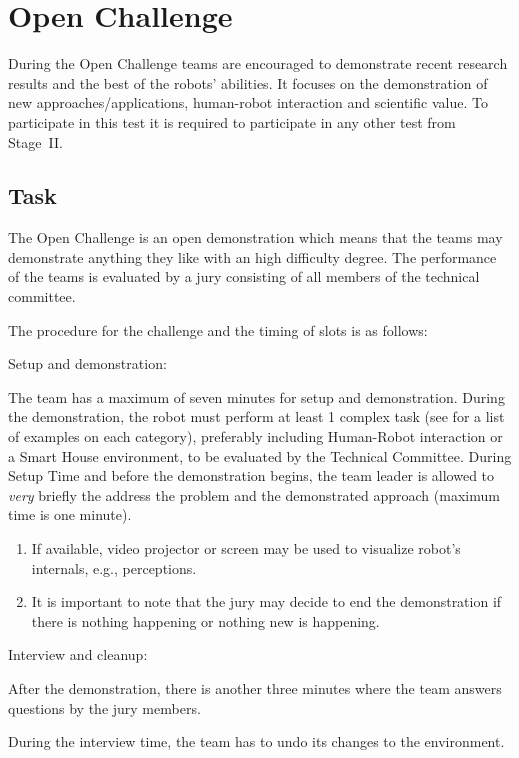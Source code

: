 \newcommand{\bonusRobotCoop}{5~}

\section{Open Challenge}
\label{sec:test_open_challenge}

During the Open Challenge teams are encouraged to demonstrate recent research results and the best of the robots' abilities. It focuses on the demonstration of new approaches/applications, human-robot interaction and scientific value. To participate in this test it is required to participate in any other test from Stage~II.

\subsection{Task}

The Open Challenge is an open demonstration which means that the teams may demonstrate anything they like with an high difficulty degree. The performance of the teams is evaluated by a jury consisting of all members of the technical committee.

The procedure for the challenge and the timing of slots is as follows:
\begin{enumerate}
  {\bf\item Setup and demonstration:} The team has a maximum of seven minutes for setup and demonstration. During the demonstration, the robot must perform at least 1 complex task (see for a list of examples on each category), preferably including Human-Robot interaction or a Smart House environment, to be evaluated by the Technical Committee. During Setup Time and before the demonstration begins, the team leader is allowed to \emph{very} briefly the address the problem and the demonstrated approach (maximum time is one minute).

	\begin{enumerate}
		\item If available, video projector or screen may be used to visualize robot's internals, e.g., perceptions.
		\item It is important to note that the jury may decide to end the demonstration if there is nothing happening or nothing new is happening.
	\end{enumerate}
  {\bf\item Interview and cleanup:} After the demonstration, there is another three minutes where the team answers questions by the jury members.

  During the interview time, the team has to undo its changes to the environment.
\end{enumerate}

